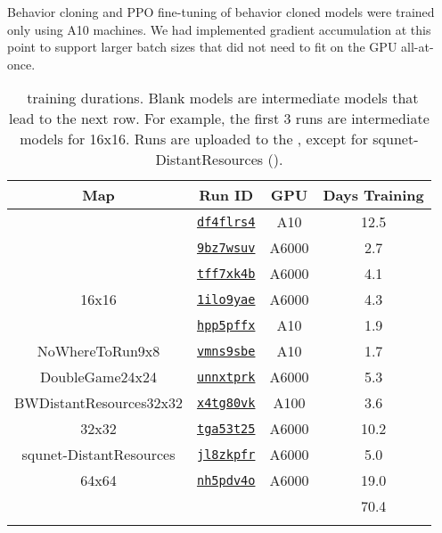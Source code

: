 \documentclass[conference,onecolumn]{IEEEtran}
\newcounter{supptable}
\newenvironment{supptable}
  {\renewcommand{\tablename}{Supplemental Table}\setcounter{table}{\value{supptable}}\addtocounter{supptable}{1}\begin{table}}
  {\end{table}\setcounter{supptable}{\value{table}}}
\begin{document}
Behavior cloning and PPO fine-tuning of behavior cloned models were trained only using
A10 machines. We had implemented gradient accumulation at this point to support larger
batch sizes that did not need to fit on the GPU all-at-once.

\label{appendix:training-durations}
\begin{supptable}[H]
    \caption{\agentName\ training durations. Blank models are intermediate models that
    lead to the next row. For example, the first 3 runs are intermediate models for
    16x16. Runs are uploaded to the \wbProject, except
    for squnet-DistantResources (\microRTSWBProjectPath).}
    \label{tab:training-durations}
    \begin{center}
    \begin{tabular}{lccc}
        \multicolumn{1}{c}{Map} & Run ID & GPU & Days Training \\
        \midrule
         & \href{https://wandb.ai/\wbProjectPath/runs/df4flrs4}{\texttt{df4flrs4}} & A10 & 12.5 \\
         & \href{https://wandb.ai/\wbProjectPath/runs/9bz7wsuv}{\texttt{9bz7wsuv}} & A6000 & 2.7 \\
         & \href{https://wandb.ai/\wbProjectPath/runs/tff7xk4b}{\texttt{tff7xk4b}} & A6000 & 4.1 \\
        \multicolumn{1}{c}{16x16} & \href{https://wandb.ai/\wbProjectPath/runs/1ilo9yae}{\texttt{1ilo9yae}} & A6000 & 4.3 \\
         \hline
         & \href{https://wandb.ai/\wbProjectPath/runs/hpp5pffx}{\texttt{hpp5pffx}} & A10 & 1.9 \\
        \multicolumn{1}{c}{NoWhereToRun9x8} & \href{https://wandb.ai/\wbProjectPath/runs/vmns9sbe}{\texttt{vmns9sbe}} & A10 & 1.7 \\
         \hline
        \multicolumn{1}{c}{DoubleGame24x24} & \href{https://wandb.ai/\wbProjectPath/runs/unnxtprk}{\texttt{unnxtprk}} & A6000 & 5.3 \\
         \hline
        \multicolumn{1}{c}{BWDistantResources32x32} & \href{https://wandb.ai/\wbProjectPath/runs/x4tg80vk}{\texttt{x4tg80vk}} & A100 & 3.6 \\
         \hline
        \multicolumn{1}{c}{32x32} & \href{https://wandb.ai/\wbProjectPath/runs/tga53t25}{\texttt{tga53t25}} & A6000 & 10.2 \\
        \multicolumn{1}{c}{squnet-DistantResources} & \href{https://wandb.ai/\microRTSWBProjectPath/runs/jl8zkpfr}{\texttt{jl8zkpfr}} & A6000 & 5.0 \\
         \hline
        \multicolumn{1}{c}{64x64} & \href{https://wandb.ai/\wbProjectPath/runs/nh5pdv4o}{\texttt{nh5pdv4o}} & A6000 & 19.0 \\
        \hline
         & \multicolumn{1}{l}{} & \multicolumn{1}{l}{} & 70.4 \\
         & \multicolumn{1}{l}{} & \multicolumn{1}{l}{} & \multicolumn{1}{l}{}
    \end{tabular}
    \end{center}
\end{supptable}
\end{document}
